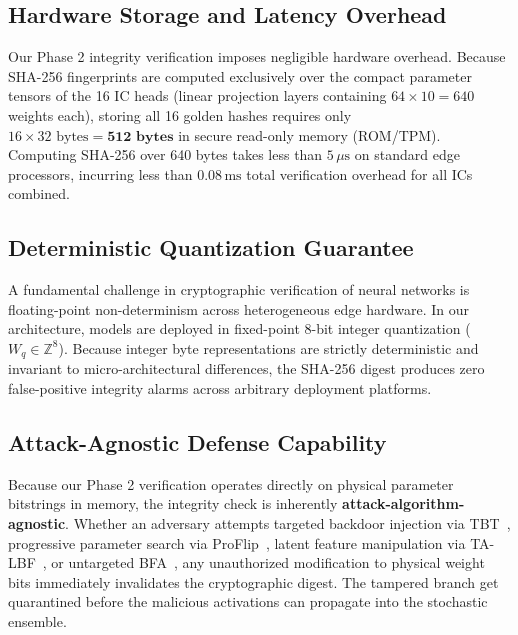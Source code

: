 \documentclass[conference,10pt]{IEEEtran}
\begin{document}
\subsection{Hardware Storage and Latency Overhead}
Our Phase 2 integrity verification imposes negligible hardware overhead. Because SHA-256 fingerprints are computed exclusively over the compact parameter tensors of the 16 IC heads (linear projection layers containing $64 \times 10 = 640$ weights each), storing all 16 golden hashes requires only $16 \times 32\text{ bytes} = \mathbf{512\text{ bytes}}$ in secure read-only memory (ROM/TPM). Computing SHA-256 over 640 bytes takes less than $5\,\mu\text{s}$ on standard edge processors, incurring less than $0.08\,\text{ms}$ total verification overhead for all ICs combined.

\subsection{Deterministic Quantization Guarantee}
A fundamental challenge in cryptographic verification of neural networks is floating-point non-determinism across heterogeneous edge hardware. In our architecture, models are deployed in fixed-point 8-bit integer quantization ($W_q \in \mathbb{Z}^8$). Because integer byte representations are strictly deterministic and invariant to micro-architectural differences, the SHA-256 digest produces zero false-positive integrity alarms across arbitrary deployment platforms.

\subsection{Attack-Agnostic Defense Capability}
Because our Phase 2 verification operates directly on physical parameter bitstrings in memory, the integrity check is inherently \textbf{attack-algorithm-agnostic}. Whether an adversary attempts targeted backdoor injection via TBT~\cite{rakin2020tbt}, progressive parameter search via ProFlip~\cite{chen2021proflip}, latent feature manipulation via TA-LBF~\cite{bai2021talbf}, or untargeted BFA~\cite{rakin2019bfa}, any unauthorized modification to physical weight bits immediately invalidates the cryptographic digest. The tampered branch get quarantined before the malicious activations can propagate into the stochastic ensemble.


\end{document}
